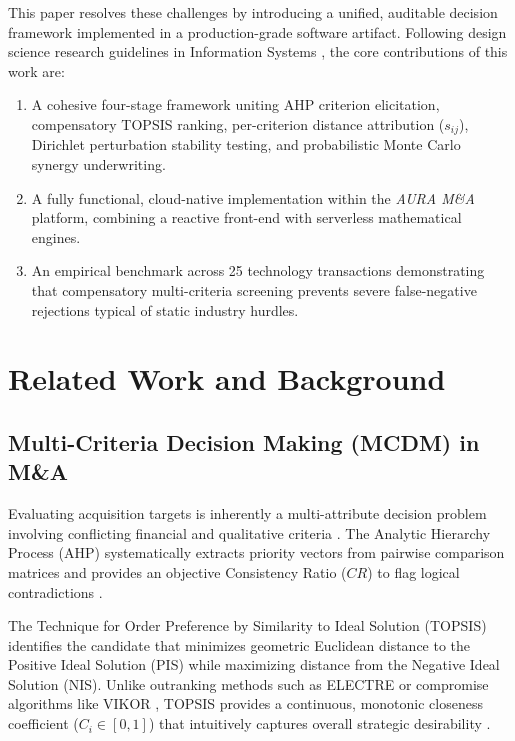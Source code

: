 \documentclass[conference]{IEEEtran}
\begin{document}
This paper resolves these challenges by introducing a unified, auditable decision framework implemented in a production-grade software artifact. Following design science research guidelines in Information Systems \cite{hevner2004design, march1995design}, the core contributions of this work are:
\begin{enumerate}
    \item A cohesive four-stage framework uniting AHP criterion elicitation, compensatory TOPSIS ranking, per-criterion distance attribution ($s_{ij}$), Dirichlet perturbation stability testing, and probabilistic Monte Carlo synergy underwriting.
    \item A fully functional, cloud-native implementation within the \textit{AURA M\&A} platform, combining a reactive front-end with serverless mathematical engines.
    \item An empirical benchmark across 25 technology transactions demonstrating that compensatory multi-criteria screening prevents severe false-negative rejections typical of static industry hurdles.
\end{enumerate}

\section{Related Work and Background}
\subsection{Multi-Criteria Decision Making (MCDM) in M\&A}
Evaluating acquisition targets is inherently a multi-attribute decision problem involving conflicting financial and qualitative criteria \cite{zavadskas2014multiple}. The Analytic Hierarchy Process (AHP) \cite{saaty1977scaling, saaty1980analytic} systematically extracts priority vectors from pairwise comparison matrices and provides an objective Consistency Ratio ($CR$) to flag logical contradictions \cite{ishizaka2011review}. 

The Technique for Order Preference by Similarity to Ideal Solution (TOPSIS) \cite{hwang1981multiple} identifies the candidate that minimizes geometric Euclidean distance to the Positive Ideal Solution (PIS) while maximizing distance from the Negative Ideal Solution (NIS). Unlike outranking methods such as ELECTRE \cite{govindan2016twenty} or compromise algorithms like VIKOR \cite{opricovic2004compromise}, TOPSIS provides a continuous, monotonic closeness coefficient ($C_i \in [0,1]$) that intuitively captures overall strategic desirability \cite{behzadian2012state, chen2000extensions}.
\end{document}
